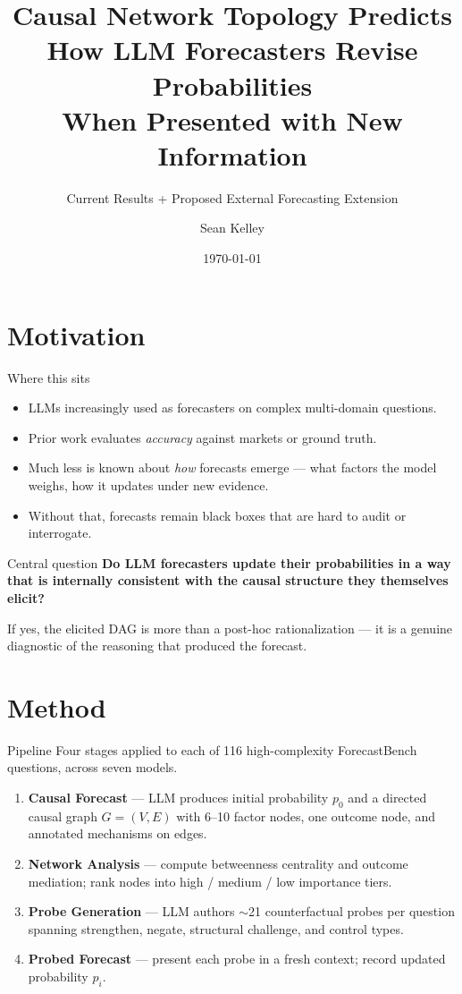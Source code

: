 \documentclass[aspectratio=169]{beamer}
\title{Causal Network Topology Predicts \\ How LLM Forecasters Revise Probabilities \\ When Presented with New Information}
\subtitle{Current Results + Proposed External Forecasting Extension}
\author{Sean Kelley}
\institute{Northeastern University \textbar{} Lab Meeting}
\date{\today}
\begin{document}
\maketitle

\section{Motivation}

\begin{frame}{Where this sits}
\begin{itemize}
  \item LLMs increasingly used as forecasters on complex multi-domain questions.
  \item Prior work evaluates \emph{accuracy} against markets or ground truth.
  \item Much less is known about \emph{how} forecasts emerge — what factors the model weighs, how it updates under new evidence.
  \item Without that, forecasts remain black boxes that are hard to audit or interrogate.
\end{itemize}
\end{frame}

\begin{frame}{Central question}
\textbf{Do LLM forecasters update their probabilities in a way that is internally consistent with the causal structure they themselves elicit?}

\vspace{1em}
If yes, the elicited DAG is more than a post-hoc rationalization — it is a genuine diagnostic of the reasoning that produced the forecast.
\end{frame}

\section{Method}

\begin{frame}{Pipeline}
Four stages applied to each of 116 high-complexity ForecastBench questions, across seven models.
\begin{enumerate}
  \item \textbf{Causal Forecast} — LLM produces initial probability $p_0$ and a directed causal graph $G=(V,E)$ with 6--10 factor nodes, one outcome node, and annotated mechanisms on edges.
  \item \textbf{Network Analysis} — compute betweenness centrality and outcome mediation; rank nodes into high / medium / low importance tiers.
  \item \textbf{Probe Generation} — LLM authors $\sim$21 counterfactual probes per question spanning strengthen, negate, structural challenge, and control types.
  \item \textbf{Probed Forecast} — present each probe in a fresh context; record updated probability $p_i$.
\end{enumerate}
\end{frame}
\end{document}
